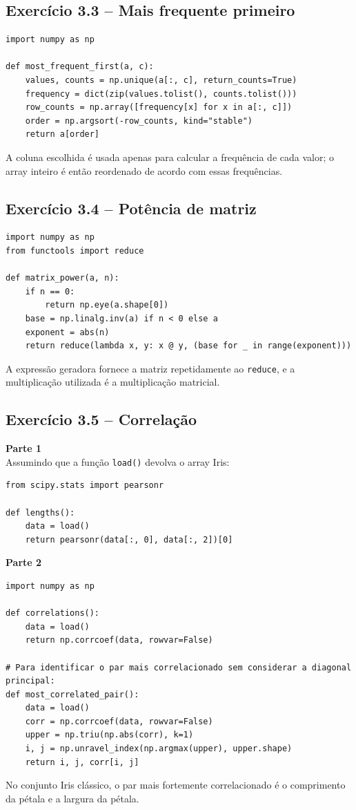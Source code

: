\documentclass[11pt,a4paper]{article}
\begin{document}
\subsection*{Exercício 3.3 -- Mais frequente primeiro}
\begin{solucao}
\begin{lstlisting}
import numpy as np

def most_frequent_first(a, c):
    values, counts = np.unique(a[:, c], return_counts=True)
    frequency = dict(zip(values.tolist(), counts.tolist()))
    row_counts = np.array([frequency[x] for x in a[:, c]])
    order = np.argsort(-row_counts, kind="stable")
    return a[order]
\end{lstlisting}
A coluna escolhida é usada apenas para calcular a frequência de cada valor; o array inteiro é então reordenado de acordo com essas frequências.
\end{solucao}

\subsection*{Exercício 3.4 -- Potência de matriz}
\begin{solucao}
\begin{lstlisting}
import numpy as np
from functools import reduce

def matrix_power(a, n):
    if n == 0:
        return np.eye(a.shape[0])
    base = np.linalg.inv(a) if n < 0 else a
    exponent = abs(n)
    return reduce(lambda x, y: x @ y, (base for _ in range(exponent)))
\end{lstlisting}
A expressão geradora fornece a matriz repetidamente ao \texttt{reduce}, e a multiplicação utilizada é a multiplicação matricial.
\end{solucao}

\subsection*{Exercício 3.5 -- Correlação}
\begin{solucao}
\textbf{Parte 1} \\
Assumindo que a função \texttt{load()} devolva o array Iris:
\begin{lstlisting}
from scipy.stats import pearsonr

def lengths():
    data = load()
    return pearsonr(data[:, 0], data[:, 2])[0]
\end{lstlisting}

\textbf{Parte 2}
\begin{lstlisting}
import numpy as np

def correlations():
    data = load()
    return np.corrcoef(data, rowvar=False)

# Para identificar o par mais correlacionado sem considerar a diagonal principal:
def most_correlated_pair():
    data = load()
    corr = np.corrcoef(data, rowvar=False)
    upper = np.triu(np.abs(corr), k=1)
    i, j = np.unravel_index(np.argmax(upper), upper.shape)
    return i, j, corr[i, j]
\end{lstlisting}
No conjunto Iris clássico, o par mais fortemente correlacionado é o comprimento da pétala e a largura da pétala.
\end{solucao}
\end{document}
